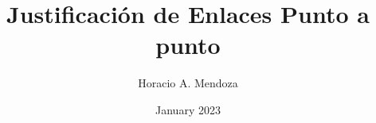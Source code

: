 \documentclass{report}
\title{Justificación de Enlaces Punto a punto}
\author{Horacio A. Mendoza }
\date{January 2023}
\begin{document}



\renewcommand{\bibname}{Referencias bibliográficas}	%
\nocite{*}
\end{document}
